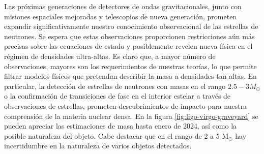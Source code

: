 Las próximas generaciones de detectores de ondas gravitacionales, junto con misiones espaciales mejoradas y telescopios de nueva generación, prometen expandir significativamente nuestro conocimiento observacional de las estrellas de neutrones. Se espera que estas observaciones proporcionen restricciones aún más precisas sobre las ecuaciones de estado y posiblemente revelen nueva física en el régimen de densidades ultra-altas. Es claro que, a mayor número de observaciones, mayores son los requerimientos de nuestras teorías, lo que permite filtrar modelos físicos que pretendan describir la masa a densidades tan altas.
En particular, la detección de estrellas de neutrones con masas en el rango $2.5-3 M_\odot$ o la confirmación de transiciones de fase en el interior estelar a través de observaciones de estrellas, prometen descubrimientos de impacto para nuestra comprensión de la materia nuclear densa. En la figura \ref{fig:ligo-virgo-graveyard} se pueden apreciar las estimaciones de masa hasta enero de 2024, así como la posible naturaleza del objeto. Cabe destacar que en el rango de 2 a 5 M$_\odot$ hay incertidumbre en la naturaleza de varios objetos detectados.


